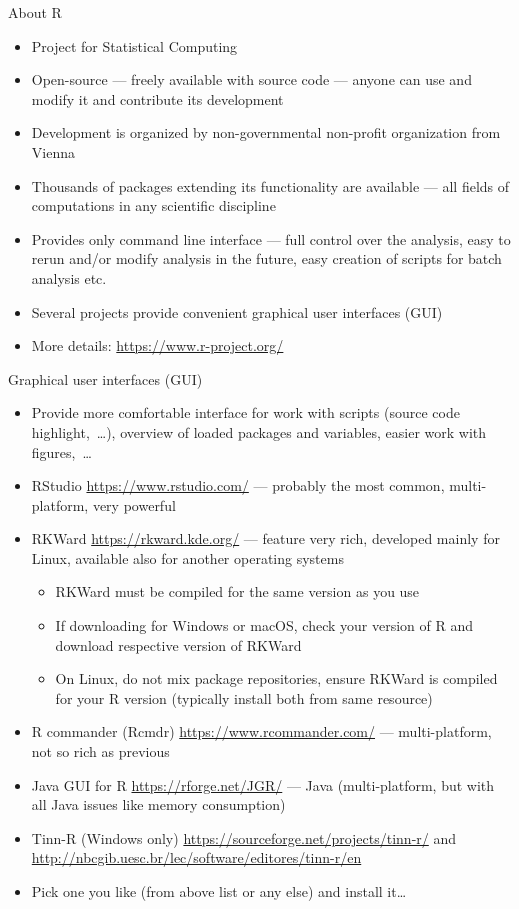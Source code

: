 \documentclass[compress, ucs, xelatex, 11pt, xcolor=svgnames,
	hyperref={
		bookmarks=true,
		unicode=true,
		colorlinks=true,
		pdftitle={Molecular data in R},
		plainpages=false,
		pdfauthor={Vojtech Zeisek},
		pdfsubject={Course about phylogeny and evolution in R},
		pdfcreator={XeLaTeX},
		pdfkeywords={R, evolution, phylogeny, molecular data},
		linkcolor=Tomato,
		anchorcolor=SaddleBrown,
		citecolor=Goldenrod,
		filecolor=DarkMagenta,
		menucolor=Sienna,
		urlcolor=DarkTurquoise,
		pdftex},
	url={hyphens, lowtilde} %
	]{beamer}
\begin{document}
\begin{frame}{About R}
	\begin{itemize}
		\item Project for Statistical Computing
		\item Open-source --- freely available with source code --- anyone can use and modify it and contribute its development
		\item Development is organized by non-governmental non-profit organization from Vienna
		\item Thousands of packages extending its functionality are available --- all fields of computations in any scientific discipline
		\item Provides only command line interface --- full control over the analysis, easy to rerun and/or modify analysis in the future, easy creation of scripts for batch analysis etc.
		\item Several projects provide convenient graphical user interfaces (GUI)
		\item More details: \url{https://www.r-project.org/}
	\end{itemize}
\end{frame}

\begin{frame}[allowframebreaks]{Graphical user interfaces (GUI)}
	\label{gui}
	\begin{itemize}
		\item Provide more comfortable interface for work with scripts (source code highlight,~\ldots), overview of loaded packages and variables, easier work with figures,~\ldots
		\item RStudio \url{https://www.rstudio.com/} --- probably the most common, multi-platform, very powerful
		\item RKWard \url{https://rkward.kde.org/} --- feature very rich, developed mainly for Linux, available also for another operating systems
		\begin{itemize}
			\item RKWard must be compiled for the same version as you use
			\item If downloading for Windows or macOS, check your version of R and download respective version of RKWard
			\item On Linux, do not mix package repositories, ensure RKWard is compiled for your R version (typically install both from same resource)
		\end{itemize}
		\item R commander (Rcmdr) \url{https://www.rcommander.com/} --- multi-platform, not so rich as previous
		\item Java GUI for R \url{https://rforge.net/JGR/} --- Java (multi-platform, but with all Java issues like memory consumption)
		\item Tinn-R (Windows only) \url{https://sourceforge.net/projects/tinn-r/} and \url{http://nbcgib.uesc.br/lec/software/editores/tinn-r/en}
		\item Pick one you like (from above list or any else) and install it\ldots
	\end{itemize}
\end{frame}
\end{document}
